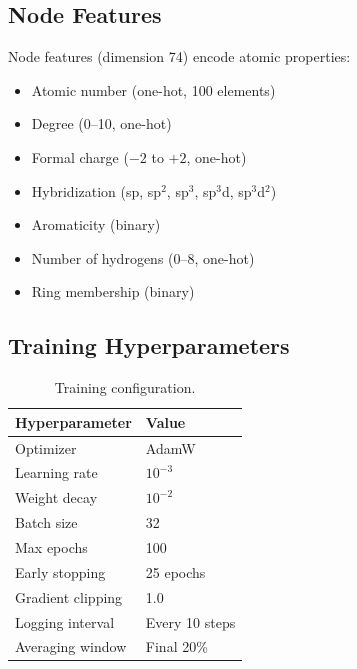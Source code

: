 \documentclass[sigconf,nonacm]{acmart}
\begin{document}
\subsection{Node Features}
Node features (dimension 74) encode atomic properties:
\begin{itemize}[nosep,topsep=2pt]
    \item Atomic number (one-hot, 100 elements)
    \item Degree (0--10, one-hot)
    \item Formal charge ($-2$ to $+2$, one-hot)
    \item Hybridization (sp, sp$^2$, sp$^3$, sp$^3$d, sp$^3$d$^2$)
    \item Aromaticity (binary)
    \item Number of hydrogens (0--8, one-hot)
    \item Ring membership (binary)
\end{itemize}
\vspace{-1mm}
\subsection{Training Hyperparameters}
\vspace{-1mm}
\begin{table}[H]
\caption{Training configuration.}
\vspace{-1mm}
\begin{center}
\begin{tabular}{@{}ll@{}}
\toprule
Hyperparameter & Value \\
\midrule
Optimizer & AdamW \\
Learning rate & $10^{-3}$ \\
Weight decay & $10^{-2}$ \\
Batch size & 32 \\
Max epochs & 100 \\
Early stopping & 25 epochs \\
Gradient clipping & 1.0 \\
Logging interval & Every 10 steps \\
Averaging window & Final 20\% \\
\bottomrule
\end{tabular}
\end{center}
\vspace{-2mm}
\end{table}
\vspace{-2mm}
\end{document}
